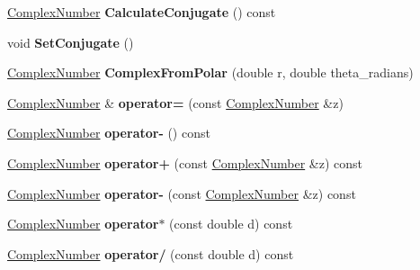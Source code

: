 \begin{DoxyCompactItemize}
\item 
\mbox{\label{class_complex_number_a0e5a8c423e3d7381224cec7841ea56cb}} 
\hyperlink{class_complex_number}{Complex\+Number} {\bfseries Calculate\+Conjugate} () const
\item 
\mbox{\label{class_complex_number_affd8dbb8111caffd73bf70e35d8098f5}} 
void {\bfseries Set\+Conjugate} ()
\item 
\mbox{\label{class_complex_number_a4e566cd69db5bac44f2ffb3382ebb5e1}} 
\hyperlink{class_complex_number}{Complex\+Number} {\bfseries Complex\+From\+Polar} (double r, double theta\+\_\+radians)
\item 
\mbox{\label{class_complex_number_a4f1af0a28c9ad06a27ceb77a4fc115f5}} 
\hyperlink{class_complex_number}{Complex\+Number} \& {\bfseries operator=} (const \hyperlink{class_complex_number}{Complex\+Number} \&z)
\item 
\mbox{\label{class_complex_number_a647004355a5f7f43e6764aa9751615de}} 
\hyperlink{class_complex_number}{Complex\+Number} {\bfseries operator-\/} () const
\item 
\mbox{\label{class_complex_number_adf755ed1c8e82c64223c569cd3a744a8}} 
\hyperlink{class_complex_number}{Complex\+Number} {\bfseries operator+} (const \hyperlink{class_complex_number}{Complex\+Number} \&z) const
\item 
\mbox{\label{class_complex_number_a62fac8ef31e8f7cf473a4e025216c1f0}} 
\hyperlink{class_complex_number}{Complex\+Number} {\bfseries operator-\/} (const \hyperlink{class_complex_number}{Complex\+Number} \&z) const
\item 
\mbox{\label{class_complex_number_a7860e52995e602941719801ecca2dcb7}} 
\hyperlink{class_complex_number}{Complex\+Number} {\bfseries operator$\ast$} (const double d) const
\item 
\mbox{\label{class_complex_number_a65b84287dd76949b4236adc928a80919}} 
\hyperlink{class_complex_number}{Complex\+Number} {\bfseries operator/} (const double d) const

\end{DoxyCompactItemize}
